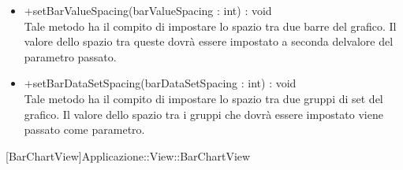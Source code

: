 \begin{itemize}
\begin{itemize}
					\item[\ding{111}] {{+setBarValueSpacing(barValueSpacing : int) : void}} \\ [1mm] Tale metodo ha il compito di impostare lo spazio tra due barre del grafico. Il valore dello spazio tra queste dovrà essere impostato a seconda delvalore del parametro passato.
					\item[\ding{111}] {{+setBarDataSetSpacing(barDataSetSpacing : int) : void}} \\ [1mm] Tale metodo ha il compito di impostare lo spazio tra due gruppi di set del grafico. Il valore dello spazio tra i gruppi che dovrà essere impostato viene passato come parametro.
				\end{itemize}
		
			\end{itemize}

			
			[BarChartView]{Applicazione::View::BarChartView}
			

	
